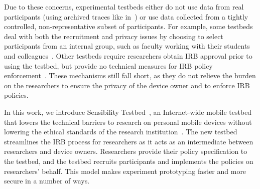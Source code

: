 Due to these concerns, experimental testbeds either do not use data 
from real participants (using archived traces like 
in~\cite{kapadia2008anonysense}) or use data collected 
from a tightly controlled, non-representative subset of participants.
For example, some testbeds deal with both
the recruitment and privacy issues by choosing to select participants
from an internal group, such as faculty working with their students
and colleagues~\cite{hao2013isleep, wang2012no, wang2013sensing}. 
Other testbeds require researchers obtain IRB approval prior to using the
testbed, but provide no technical measures for IRB policy 
enforcement~\cite{phonelab, nandugudi2013phonelab}. 
These mechanisms still fall short, as they do not 
relieve the burden on the researchers to ensure the privacy of the
device owner and to enforce IRB policies. 

In this work, we introduce Sensibility Testbed~\cite{sensibility,
zhuang2015privacy}, an Internet-wide mobile testbed that 
lowers the technical barriers to research on personal mobile
devices without lowering the ethical standards of the research
institution~\cite{zevenbergen2013ethical}.  
The new testbed streamlines the IRB process for researchers as it acts 
as an intermediate between researchers and device owners. 
Researchers provide their policy specification to the testbed, and 
the testbed recruits participants and implements the policies on researchers' 
behalf. This model 
makes experiment prototyping faster and more secure in a number of ways. 

